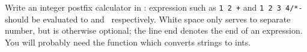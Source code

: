Write an integer postfix calculator in \lex: expression such as
\verb/1 2 +/ and \verb.1 2 3 4/*-. should be evaluated to 
and~ respectively. White space only serves to separate number,
but is otherwise optional; the line end denotes the end of an
expression. You will probably need the  function  which converts strings to ints.
